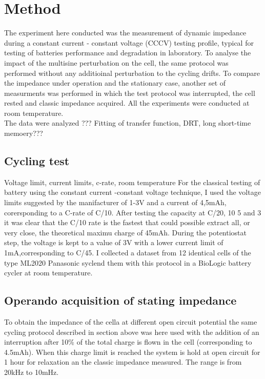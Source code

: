 \section{Method}

The experiment here conducted was the measurement of dynamic impedance during a constant current - constant voltage (CCCV) testing profile, typical for testing of batteries performance and degradation in laboratory. To analyse the impact of the multisine perturbation on the cell, the same protocol was performed without any additioinal perturbation to the cycling drifts. To compare the impedance under operation and the stationary case, another set of measurments was performed in which the test protocol was interrupted, the cell rested and classic impedance acquired. All the experiments were conducted at room temperature.\\
The data were analyzed ??? Fitting of transfer function, DRT, long short-time memoery???

\subsection{Cycling test}
Voltage limit, current limits, c-rate, room temperature
For the classical testing of battery using the constant current -constant voltage technique, I used the voltage limits suggested by the manifacturer of 1-3V and a current of 4,5mAh, corersponding to a C-rate of C/10. After testing the capacity at C/20, 10 5 and 3 it was clear that the C/10 rate is the fastest that could possible extract all, or very close, the theoretical maximu charge of 45mAh. During the potentiostat step, the voltage is kept to a value of 3V with a lower current limit of 1mA,corresponding to C/45. I collected a dataset from 12 identical cells of the type ML2020 Panasonic syclend them with this protocol in a BioLogic battery cycler at room temperature. 
\subsection{Operando acquisition of stating impedance}
To obtain the impedance of the cella at different open circuit potential the same cycling protocol described in section above was here used with the addition of an interruption after 10\% of the total charge is flown in the cell (corresponding to 4.5mAh). When this charge limit is reached the system is hold at open circuit for 1 hour for relaxation an the classic impedance measured. The range is from 20kHz to 10mHz. 
